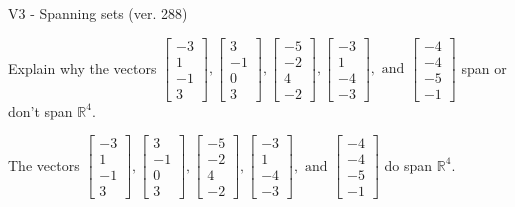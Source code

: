 \begin{exercise}
  \begin{exerciseTitle}V3 - Spanning sets (ver. 288)\end{exerciseTitle}
  \begin{exerciseStatement}
    Explain why the vectors \(\left[\begin{array}{r}
-3 \\
1 \\
-1 \\
3
\end{array}\right] , \left[\begin{array}{r}
3 \\
-1 \\
0 \\
3
\end{array}\right] , \left[\begin{array}{r}
-5 \\
-2 \\
4 \\
-2
\end{array}\right] , \left[\begin{array}{r}
-3 \\
1 \\
-4 \\
-3
\end{array}\right] , \text{ and } \left[\begin{array}{r}
-4 \\
-4 \\
-5 \\
-1
\end{array}\right]\) span or don't span \(\mathbb{R}^4\). 
	


  \end{exerciseStatement}
  \begin{exerciseAnswer}
   The vectors \(\left[\begin{array}{r}
-3 \\
1 \\
-1 \\
3
\end{array}\right] , \left[\begin{array}{r}
3 \\
-1 \\
0 \\
3
\end{array}\right] , \left[\begin{array}{r}
-5 \\
-2 \\
4 \\
-2
\end{array}\right] , \left[\begin{array}{r}
-3 \\
1 \\
-4 \\
-3
\end{array}\right] , \text{ and } \left[\begin{array}{r}
-4 \\
-4 \\
-5 \\
-1
\end{array}\right]\) 
  	 do  
	span \(\mathbb{R}^4\).
  



\end{exerciseAnswer}
\end{exercise}
